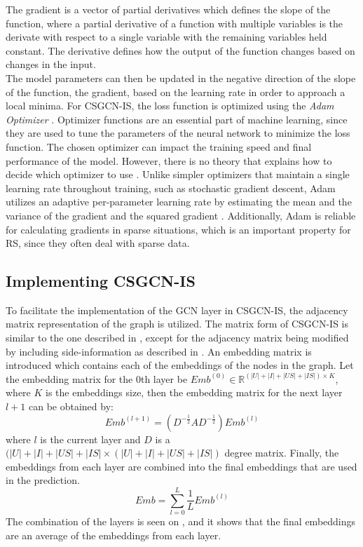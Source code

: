 The gradient is a vector of partial derivatives which defines the slope of the function, where a partial derivative of a function with multiple variables is the derivate with respect to a single variable with the remaining variables held constant.
The derivative defines how the output of the function changes based on changes in the input.\\
The model parameters can then be updated in the negative direction of the slope of the function, the gradient, based on the learning rate in order to approach a local minima. 
For CSGCN-IS, the loss function is optimized using the \textit{Adam Optimizer} \cite{AdamOptimizer}.
Optimizer functions are an essential part of machine learning, since they are used to tune the parameters of the neural network to minimize the loss function.
The chosen optimizer can impact the training speed and final performance of the model.
However, there is no theory that explains how to decide which optimizer to use \cite{EmpiricalOptimizers}.
Unlike simpler optimizers that maintain a single learning rate throughout training, such as stochastic gradient descent, Adam utilizes an adaptive per-parameter learning rate by estimating the mean and the variance of the gradient and the squared gradient \cite{AdamOptimizer}.
Additionally, Adam is reliable for calculating gradients in sparse situations, which is an important property for RS, since they often deal with sparse data.

\subsection{Implementing CSGCN-IS}
To facilitate the implementation of the GCN layer in CSGCN-IS, the adjacency matrix representation of the graph is utilized.
The matrix form of CSGCN-IS is similar to the one described in \cite{LightGCN}, except for the adjacency matrix being modified by including side-information as described in .
An embedding matrix is introduced which contains each of the embeddings of the nodes in the graph.
Let the embedding matrix for the 0th layer be $Emb^{(0)} \in \mathbb{R}^{(|U| + |I| + |US| + |IS|) \times K}$, where $K$ is the embeddings size, then the embedding matrix for the next layer $l+1$ can be obtained by:
\begin{equation}
    Emb^{(l+1)} = (D^{-\frac{1}{2}}AD^{-\frac{1}{2}})Emb^{(l)}
\end{equation}
where $l$ is the current layer and $D$ is a $(|U| + |I| + |US| + |IS| \times (|U| + |I| + |US| + |IS|)$ degree matrix. 
Finally, the embeddings from each layer are combined into the final embeddings that are used in the prediction.
\begin{equation}\label{eq:layer_comb}
    Emb = \sum_{l=0}^{L} \frac{1}{L} Emb^{(l)}
\end{equation}
The combination of the layers is seen on , and it shows that the final embeddings are an average of the embeddings from each layer.

